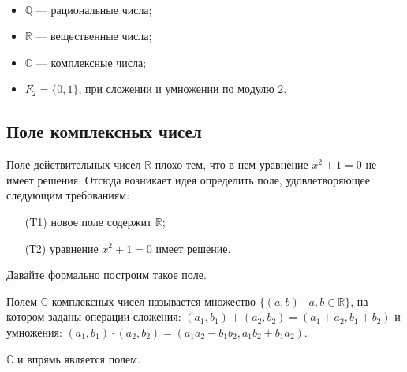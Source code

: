 \begin{Examples} \ 
\begin{itemize}
\item $\mathbb{Q}$ — рациональные числа; 
\item $\mathbb{R}$ — вещественные числа;
\item $\mathbb{C}$ — комплексные числа;
\item $F_2 = \{0, 1\}$, при сложении и умножении по модулю 2.
\end{itemize}
\end{Examples}

\subsection{Поле комплексных чисел}
Поле действительных чисел $\mathbb{R}$ плохо тем, что в нем уравнение $x^2 + 1 = 0$ не имеет решения. Отсюда возникает идея определить поле, удовлетворяющее следующим требованиям:
\begin{itemize}
\item[(T1)] новое поле содержит $\mathbb{R}$;
\item[(Т2)] уравнение $x^2 +1 = 0$ имеет решение.
\end{itemize}
Давайте формально построим такое поле.

\begin{Def}
Полем $\mathbb{C}$ комплексных чисел называется множество $\{(a, b) \mid a, b \in \mathbb{R}\}$, на котором заданы операции сложения: $(a_1, b_1) + (a_2, b_2) = (a_1 + a_2, b_1 + b_2)$ и умножения: $(a_1, b_1) \cdot (a_2, b_2) = (a_1a_2 - b_1b_2, a_1b_2 + b_1a_2)$.
\end{Def}

\begin{Suggestion}
$\mathbb{C}$ и впрямь является полем.
\end{Suggestion}


